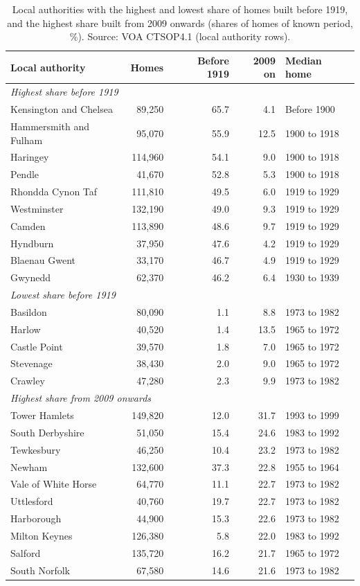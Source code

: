 \documentclass[11pt,a4paper]{article}
\begin{document}
\begin{table}[tbp]\centering\small\caption{Local authorities with the highest and lowest share of homes built before 1919, and the highest share built from 2009 onwards (shares of homes of known period, \%). Source: VOA CTSOP4.1 (local authority rows).}\label{tab:la}\begin{tabular}{lrrrl}\toprule Local authority & Homes & Before 1919 & 2009 on & Median home\\\midrule
\multicolumn{5}{l}{\textit{Highest share before 1919}}\\
\quad Kensington and Chelsea & 89,250 & 65.7 & 4.1 & Before 1900\\
\quad Hammersmith and Fulham & 95,070 & 55.9 & 12.5 & 1900 to 1918\\
\quad Haringey & 114,960 & 54.1 & 9.0 & 1900 to 1918\\
\quad Pendle & 41,670 & 52.8 & 5.3 & 1900 to 1918\\
\quad Rhondda Cynon Taf & 111,810 & 49.5 & 6.0 & 1919 to 1929\\
\quad Westminster & 132,190 & 49.0 & 9.3 & 1919 to 1929\\
\quad Camden & 113,890 & 48.6 & 9.7 & 1919 to 1929\\
\quad Hyndburn & 37,950 & 47.6 & 4.2 & 1919 to 1929\\
\quad Blaenau Gwent & 33,170 & 46.7 & 4.9 & 1919 to 1929\\
\quad Gwynedd & 62,370 & 46.2 & 6.4 & 1930 to 1939\\
\multicolumn{5}{l}{\textit{Lowest share before 1919}}\\
\quad Basildon & 80,090 & 1.1 & 8.8 & 1973 to 1982\\
\quad Harlow & 40,520 & 1.4 & 13.5 & 1965 to 1972\\
\quad Castle Point & 39,570 & 1.8 & 7.0 & 1965 to 1972\\
\quad Stevenage & 38,430 & 2.0 & 9.0 & 1965 to 1972\\
\quad Crawley & 47,280 & 2.3 & 9.9 & 1973 to 1982\\
\multicolumn{5}{l}{\textit{Highest share from 2009 onwards}}\\
\quad Tower Hamlets & 149,820 & 12.0 & 31.7 & 1993 to 1999\\
\quad South Derbyshire & 51,050 & 15.4 & 24.6 & 1983 to 1992\\
\quad Tewkesbury & 46,250 & 10.4 & 23.2 & 1973 to 1982\\
\quad Newham & 132,600 & 37.3 & 22.8 & 1955 to 1964\\
\quad Vale of White Horse & 64,770 & 11.1 & 22.7 & 1973 to 1982\\
\quad Uttlesford & 40,760 & 19.7 & 22.7 & 1973 to 1982\\
\quad Harborough & 44,900 & 15.3 & 22.6 & 1973 to 1982\\
\quad Milton Keynes & 126,380 & 5.8 & 22.0 & 1983 to 1992\\
\quad Salford & 135,720 & 16.2 & 21.7 & 1965 to 1972\\
\quad South Norfolk & 67,580 & 14.6 & 21.6 & 1973 to 1982\\
\bottomrule\end{tabular}\end{table}
\end{document}
